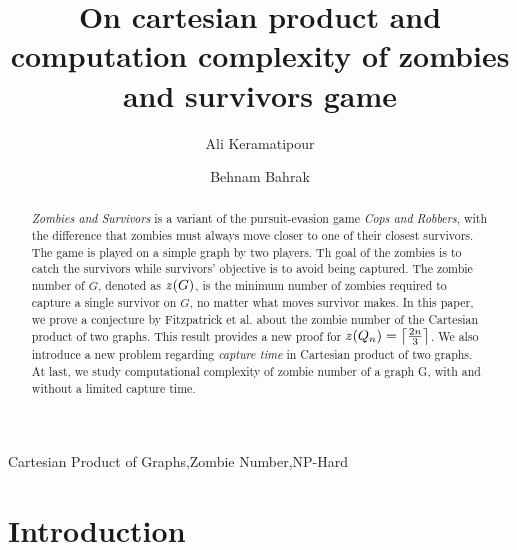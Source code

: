 \documentclass[1p]{elsarticle}
\DeclarePairedDelimiter\ceil{\lceil}{\rceil} \DeclarePairedDelimiter\floor{\lfloor}{\rfloor}
\newcommand{\zn}{\ooalign{$z$\cr\hfil\rule[.5ex]{.2em}{.08ex}\hfil\cr}}
\begin{document}
	
	\begin{frontmatter}
		
		\title{On cartesian product and computation complexity of zombies and survivors game}
		
		
		\author{Ali Keramatipour}
		
		\author{Behnam Bahrak}
		
		\address{School of Electrical and Computer Engineering, College of Engineering, University of Tehran, Tehran, Iran}
		
		\begin{abstract}
		{\it Zombies and Survivors} is a variant of the pursuit-evasion game {\it Cops and Robbers}, with the difference
		that zombies must always move closer to one of their closest survivors. The game is played on a simple graph by
		two players. Th goal of the zombies is to catch the survivors while survivors' objective is to avoid being
		captured. The zombie number of $G$, denoted as $\zn(G)$, is the minimum number of zombies required to capture a
		single survivor on $G$, no matter what moves survivor makes. In this paper, we prove a conjecture by Fitzpatrick
		et al.\cite{Fitz16} about the zombie number of the Cartesian product of two graphs. This result provides a new
		proof for $\zn(Q_n) = \ceil*{\frac{2n}{3}}$. We also introduce a new problem regarding {\it capture time} in
		Cartesian product of two graphs. At last, we study computational complexity of zombie number of a graph G, with
		and without a limited capture time.
		\end{abstract}
		
		\begin{keyword}
			Cartesian Product of Graphs\sep Zombie Number\sep NP-Hard
		\end{keyword}
		
	\end{frontmatter}
	
\section{Introduction}\label{section-introduction}
\end{document}
